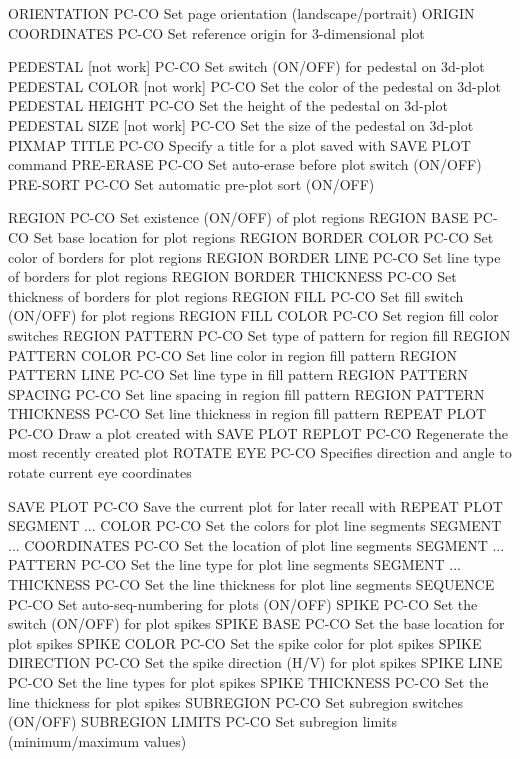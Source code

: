 ORIENTATION                 PC-CO Set page orientation (landscape/portrait)
ORIGIN COORDINATES          PC-CO Set reference origin for 3-dimensional plot

PEDESTAL        [not work]  PC-CO Set switch (ON/OFF) for pedestal on 3d-plot
PEDESTAL COLOR  [not work]  PC-CO Set the color of the pedestal on 3d-plot
PEDESTAL HEIGHT             PC-CO Set the height of the pedestal on 3d-plot
PEDESTAL SIZE   [not work]  PC-CO Set the size of the pedestal on 3d-plot
PIXMAP TITLE                PC-CO Specify a title for a plot saved with SAVE PLOT command
PRE-ERASE                   PC-CO Set auto-erase before plot switch (ON/OFF)
PRE-SORT                    PC-CO Set automatic pre-plot sort (ON/OFF)

REGION                      PC-CO Set existence (ON/OFF) of plot regions
REGION BASE                 PC-CO Set base location for plot regions
REGION BORDER COLOR         PC-CO Set color of borders for plot regions
REGION BORDER LINE          PC-CO Set line type of borders for plot regions
REGION BORDER THICKNESS     PC-CO Set thickness of borders for plot regions
REGION FILL                 PC-CO Set fill switch (ON/OFF) for plot regions
REGION FILL COLOR           PC-CO Set region fill color switches
REGION PATTERN              PC-CO Set type of pattern for region fill
REGION PATTERN COLOR        PC-CO Set line color in region fill pattern
REGION PATTERN LINE         PC-CO Set line type in fill pattern
REGION PATTERN SPACING      PC-CO Set line spacing in region fill pattern
REGION PATTERN THICKNESS    PC-CO Set line thickness in region fill pattern
REPEAT PLOT                 PC-CO Draw a plot created with SAVE PLOT
REPLOT                      PC-CO Regenerate the most recently created plot
ROTATE EYE                  PC-CO Specifies direction and angle to rotate current eye coordinates

SAVE PLOT                   PC-CO Save the current plot for later recall with REPEAT PLOT
SEGMENT ... COLOR           PC-CO Set the colors for plot line segments
SEGMENT ... COORDINATES     PC-CO Set the location of plot line segments
SEGMENT ... PATTERN         PC-CO Set the line type for plot line segments
SEGMENT ... THICKNESS       PC-CO Set the line thickness for plot line segments
SEQUENCE                    PC-CO Set auto-seq-numbering for plots (ON/OFF)
SPIKE                       PC-CO Set the switch (ON/OFF) for plot spikes
SPIKE BASE                  PC-CO Set the base location for plot spikes
SPIKE COLOR                 PC-CO Set the spike color for plot spikes
SPIKE DIRECTION             PC-CO Set the spike direction (H/V) for plot spikes
SPIKE LINE                  PC-CO Set the line types for plot spikes
SPIKE THICKNESS             PC-CO Set the line thickness for plot spikes
SUBREGION                   PC-CO Set subregion switches (ON/OFF)
SUBREGION LIMITS            PC-CO Set subregion limits (minimum/maximum values)

